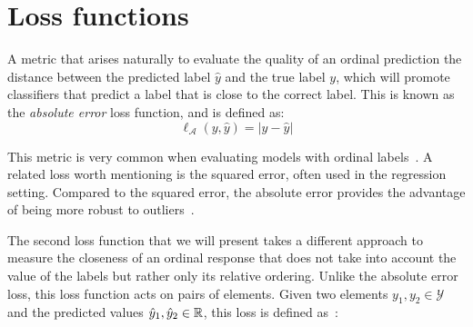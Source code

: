 







\section{Loss functions}\label{sec:loss_functions}

A metric that arises naturally to evaluate the quality of an ordinal prediction the distance between the predicted label $\hat{y}$ and the true label $y$, which will promote classifiers that predict a label that is close to the correct label. This is known as the \emph{absolute error} loss function, and is defined as:
\begin{equation*}
\ell_{\mathcal{A}}(y, \hat{y}) = |y - \hat{y}| 
\end{equation*}

This metric is very common when evaluating models with ordinal labels~\citep{Cardoso2011}. A related loss  worth mentioning is the squared error, often used in the regression setting. Compared to the squared error, the absolute error provides the advantage of being more robust to outliers~\citep{bloomfield1983least}.

The second loss function that we will present takes a different approach to measure the closeness of an ordinal response that does not take into account the value of the labels but rather only its relative ordering.
Unlike the absolute error loss, this loss function acts on pairs of elements. Given two elements $y_1, y_2 \in \mathcal{Y}$ and the predicted values $\hat{y}_1, \hat{y}_2 \in {\mathbb R}$, this loss is defined as~\citep{schapire1998learning, Herbrich2000}:


